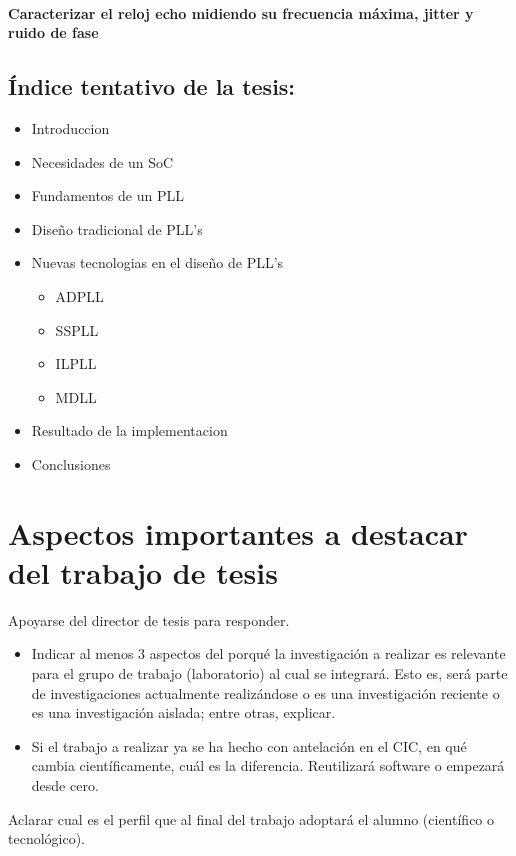 \documentclass[runningheads,a4paper]{llncs}
\begin{document}
\paragraph{Caracterizar el reloj echo midiendo su frecuencia máxima, jitter y ruido de fase}


\subsection{Índice tentativo de la tesis:}
\begin{itemize}
\item Introduccion
\item Necesidades de un SoC
\item Fundamentos de un PLL
\item Diseño tradicional de PLL's
\item Nuevas tecnologias en el diseño de PLL's
\begin{itemize}
    \item ADPLL
    \item SSPLL
    \item ILPLL
    \item MDLL
\end{itemize}
\item Resultado de la implementacion
\item Conclusiones
\end{itemize}

\section{Aspectos importantes a destacar del trabajo de tesis}
Apoyarse del director de tesis para responder.

\begin{itemize}
\settowidth{\leftmargin}{{\Large$\circ$}}\advance\leftmargin{}
\itemsep8pt\relax
\renewcommand\labelitemi{{\lower1.5pt\hbox{\Large$\circ$}}}
 \item Indicar al menos 3 aspectos del porqué la investigación a realizar es relevante para el grupo de trabajo (laboratorio) al cual se integrará. Esto es, será parte de investigaciones actualmente realizándose o es una investigación reciente o es una investigación aislada; entre otras, explicar.
 \item Si el trabajo a realizar ya se ha hecho con antelación en el CIC, en qué cambia científicamente, cuál es la diferencia. Reutilizará software o empezará desde cero.

 \end{itemize}
Aclarar cual es el perfil que al final del trabajo adoptará el alumno (científico o tecnológico).
\end{document}
